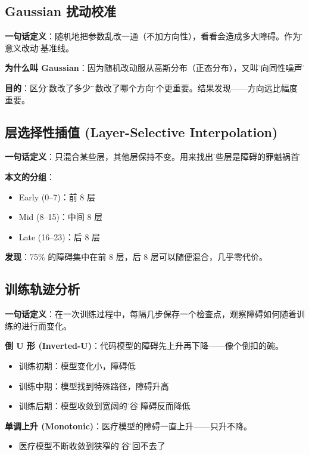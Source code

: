 \documentclass[12pt,a4paper]{article}
\begin{document}
\subsection{Gaussian 扰动校准}

\begin{conceptbox}
\textbf{一句话定义}：随机地把参数乱改一通（不加方向性），看看会造成多大障碍。作为\"无意义改动\"的基准线。

\textbf{为什么叫 Gaussian}：因为随机改动服从高斯分布（正态分布），又叫\"各向同性噪声\"。

\textbf{目的}：区分\"参数改了多少\"和\"参数改了哪个方向\"哪个更重要。结果发现——方向远比幅度重要。
\end{conceptbox}

\subsection{层选择性插值 (Layer-Selective Interpolation)}

\begin{conceptbox}
\textbf{一句话定义}：只混合某些层，其他层保持不变。用来找出\"哪些层是障碍的罪魁祸首\"。

\textbf{本文的分组}：
\begin{itemize}
    \item Early (0--7)：前 8 层
    \item Mid (8--15)：中间 8 层
    \item Late (16--23)：后 8 层
\end{itemize}

\textbf{发现}：75\% 的障碍集中在前 8 层，后 8 层可以随便混合，几乎零代价。
\end{conceptbox}

\subsection{训练轨迹分析}

\begin{conceptbox}
\textbf{一句话定义}：在一次训练过程中，每隔几步保存一个检查点，观察障碍如何随着训练的进行而变化。

\textbf{倒 U 形 (Inverted-U)}：代码模型的障碍先上升再下降——像个倒扣的碗。
\begin{itemize}
    \item 训练初期：模型变化小，障碍低
    \item 训练中期：模型找到特殊路径，障碍升高
    \item 训练后期：模型收敛到宽阔的\"山谷\"，障碍反而降低
\end{itemize}

\textbf{单调上升 (Monotonic)}：医疗模型的障碍一直上升——只升不降。
\begin{itemize}
    \item 医疗模型不断收敛到狭窄的\"山谷\"，回不去了
\end{itemize}
\end{conceptbox}
\end{document}

